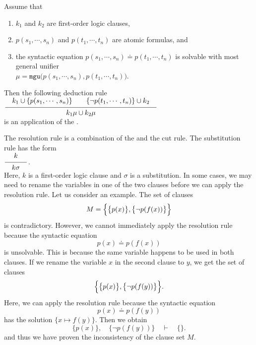 \begin{Definition}  
    Assume that
    \begin{enumerate}
    \item $k_1$ and $k_2$ are first-order logic clauses,
    \item $p(s_1,\cdots,s_n)$ and $p(t_1,\cdots,t_n)$ are atomic formulas, and
    \item the syntactic equation $p(s_1,\cdots,s_n) \doteq p(t_1,\cdots,t_n)$ is solvable with most general unifier
          \\[0.2cm]
          \hspace*{1.3cm}
          $\mu = \mathtt{mgu}\bigl(p(s_1,\cdots,s_n), p(t_1,\cdots,t_n)\bigr)$. 
    \end{enumerate}
     Then the following deduction rule
     \\[0.2cm]
     \hspace*{1.3cm}
     $\schluss{k_1 \cup\{ p(s_1,\cdots,s_n)\} \quad\quad \{\neg p(t_1,\cdots,t_n)\} \cup k_2}{
                 k_1\mu \cup k_2\mu} 
               $
     \\[0.2cm]
     is an application of the .
     \eox
\end{Definition}

The resolution rule is a combination of the  and the cut rule. The substitution rule  has the form
\\[0.2cm]
\hspace*{1.3cm}
$\schluss{k}{k\sigma}$.
\\[0.2cm]
Here, $k$ is a first-order logic clause and $\sigma$ is a substitution.
In some cases, we may need to rename the variables in one of the two clauses before we can apply the resolution rule. Let us consider an example.
The set of clauses
\[ M = \Bigl\{ \bigl\{ p(x) \bigr\}, \bigl\{ \neg p(f(x)) \bigr\} \Bigr\} \]
is contradictory. However, we cannot immediately apply the resolution rule because the syntactic equation
\[ p(x) \doteq p(f(x)) \]
is unsolvable. This is because the same variable happens to be used in both clauses. If we rename the variable $x$ in the second clause to $y$, we get the set of clauses
\[ \Bigl\{ \bigl\{ p(x) \bigr\}, \bigl\{ \neg p(f(y)) \bigr\} \Bigr\}. \]
Here, we can apply the resolution rule because the syntactic equation
\[ p(x) \doteq p(f(y)) \]
has the solution $\{ x \mapsto f(y) \}$. Then we obtain
\[ \bigl\{ p(x) \bigr\}, \quad \bigl\{ \neg p(f(y)) \bigr\} \quad \vdash \quad \{\}. \]
and thus we have proven the inconsistency of the clause set $M$.


